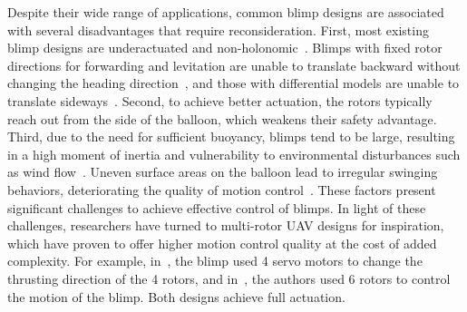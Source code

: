 \documentclass[conference]{ieeeconf}
\newcommand{\qb}[1]{\todo[size=\footnotesize, color=orange!40]{#1}}
\begin{document}
Despite their wide range of applications, common blimp designs are associated with several disadvantages that require reconsideration. First, most existing blimp designs are underactuated and non-holonomic~\cite{liew2017recent,Wang2020}. Blimps with fixed rotor directions for forwarding and levitation are unable to translate backward without changing the heading direction~\cite{Qiuyang2018,sebbane2011lighter}, and those with differential models are unable to translate sideways~\cite{2021Stabilization}. Second, to achieve better actuation, the rotors typically reach out from the side of the balloon, which weakens their safety advantage.
Third, due to the need for sufficient buoyancy, blimps tend to be large, resulting in a high moment of inertia and vulnerability to environmental disturbances such as wind flow~\cite{ouerghi2022improved}. 
Uneven surface areas on the balloon lead to irregular swinging behaviors, deteriorating the quality of motion control~\cite{Qiuyang2018}. These factors present significant challenges to achieve effective control of blimps. 
In light of these challenges, researchers have turned to multi-rotor UAV designs for inspiration, which have proven to offer higher motion control quality at the cost of added complexity. For example, in~\cite{yin2012}, the blimp used 4 servo motors to change the thrusting direction of the 4 rotors, and in~\cite{Burri2013}, the authors used 6 rotors to control the motion of the blimp. Both designs achieve full actuation. 
\end{document}
